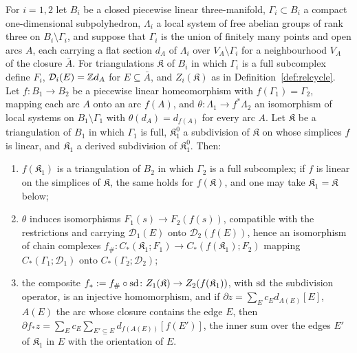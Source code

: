 \begin{lemma}\label{lem:transport}
For $i=1,2$ let $B_i$ be a closed piecewise linear three-manifold, $\Gamma_i\subset B_i$ a compact one-dimensional
subpolyhedron, $\Lambda_i$ a local system of free abelian groups of rank three on $B_i\setminus\Gamma_i$, and suppose that
$\Gamma_i$ is the union of finitely many points and open arcs $A$, each carrying a flat section $d_A$ of $\Lambda_i$ over
$V_A\setminus\Gamma_i$ for a neighbourhood $V_A$ of the closure $\bar A$. For triangulations
$\mathfrak K$ of $B_i$ in which $\Gamma_i$ is a full subcomplex define $F_i$, $\mathcal D_i(E)=\mathbb Z d_A$ for $E\subseteq\bar A$,
and $Z_i(\mathfrak K)$ as in Definition~\ref{def:relcycle}. Let $f\colon B_1\to B_2$ be a piecewise linear homeomorphism
with $f(\Gamma_1)=\Gamma_2$, mapping each arc $A$ onto an arc $f(A)$, and $\theta\colon\Lambda_1\to f^*\Lambda_2$ an
isomorphism of local systems on $B_1\setminus\Gamma_1$ with $\theta(d_A)=d_{f(A)}$ for every arc $A$. Let $\mathfrak K$ be a
triangulation of $B_1$ in which $\Gamma_1$ is full, $\mathfrak K^0_1$ a subdivision of $\mathfrak K$ on whose simplices $f$
is linear, and $\mathfrak K_1$ a derived subdivision of $\mathfrak K^0_1$. Then:
\begin{enumerate}
\item $f(\mathfrak K_1)$ is a triangulation of $B_2$ in which $\Gamma_2$ is a full subcomplex; if $f$ is linear on the
simplices of $\mathfrak K$, the same holds for $f(\mathfrak K)$, and one may take $\mathfrak K_1=\mathfrak K$ below;
\item $\theta$ induces isomorphisms $F_1(s)\to F_2(f(s))$, compatible with the restrictions and carrying $\mathcal
D_1(E)$ onto $\mathcal D_2(f(E))$, hence an isomorphism of chain complexes $f_\#\colon C_*(\mathfrak K_1;F_1)\to
C_*(f(\mathfrak K_1);F_2)$ mapping $C_*(\Gamma_1;\mathcal D_1)$ onto $C_*(\Gamma_2;\mathcal D_2)$;
\item the composite $f_*:=f_\#\circ\operatorname{sd}\colon Z_1(\mathfrak K)\to Z_2(f(\mathfrak K_1))$, with $\operatorname{sd}$ the subdivision
operator, is an injective homomorphism, and if $\partial z=\sum_Ec_Ed_{A(E)}[E]$, $A(E)$ the arc whose closure contains the edge $E$,
then $\partial f_*z=\sum_Ec_E\sum_{E'\subseteq E}d_{f(A(E))}[f(E')]$, the inner sum over the edges $E'$ of $\mathfrak K_1$
in $E$ with the orientation of $E$.
\end{enumerate}
\end{lemma}

